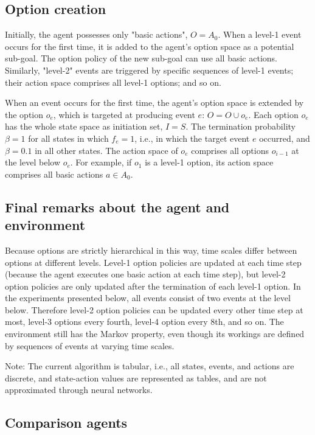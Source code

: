 \documentclass{article}
\begin{document}
\subsection{Option creation}

Initially, the agent possesses only "basic actions", $O = A_0$. When a level-1 event occurs for the first time, it is added to the agent's option space as a potential sub-goal. The option policy of the new sub-goal can use all basic actions. Similarly, "level-2" events are triggered by specific sequences of level-1 events; their action space comprises all level-1 options; and so on.

When an event occurs for the first time, the agent's option space is extended by the option $o_e$, which is targeted at producing event $e$: $O = O \cup o_e$. Each option $o_e$ has the whole state space as initiation set, $I = S$. The termination probability $\beta = 1$ for all states in which $f_e = 1$, i.e., in which the target event $e$ occurred, and $\beta = 0.1$ in all other states. The action space of $o_e$ comprises all options $o_{i-1}$ at the level below $o_e$. For example, if $o_1$ is a level-1 option, its action space comprises all basic actions $a \in A_0$. 

\subsection{Final remarks about the agent and environment}

Because options are strictly hierarchical in this way, time scales differ between options at different levels. Level-1 option policies are updated at each time step (because the agent executes one basic action at each time step), but level-2 option policies are only updated after the termination of each level-1 option. In the experiments presented below, all events consist of two events at the level below. Therefore level-2 option policies can be updated every other time step at most, level-3 options every fourth, level-4 option every 8th, and so on. The environment still has the Markov property, even though its workings are defined by sequences of events at varying time scales. 

Note: The current algorithm is tabular, i.e., all states, events, and actions are discrete, and state-action values are represented as tables, and are not approximated through neural networks.

\subsection{Comparison agents}
\end{document}
